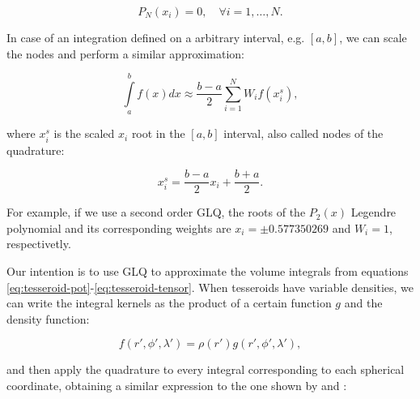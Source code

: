 \documentclass[extra]{gji}
\begin{document}
\begin{equation}
    P_N(x_i) = 0, \quad \forall i = {1,\dots,N}.
\end{equation}

In case of an integration defined on a arbitrary interval, e.g. $[a,b]$, we can scale the nodes and perform a similar approximation:

\begin{equation}
    \int\limits_a^b f(x) dx \approx \frac{b-a}{2} \sum_{i=1}^N W_i f(x_i^s),
\end{equation}

\noindent where $x_i^s$ is the scaled $x_i$ root in the $[a,b]$ interval, also called nodes of the quadrature:

\begin{equation}
    x_i^s = \frac{b-a}{2} x_i + \frac{b+a}{2}.
\end{equation}

For example, if we use a second order GLQ, the roots of the $P_2(x)$ Legendre polynomial and its corresponding weights are $x_i = \pm 0.577350269$ and $W_i = 1$, respectivetly.

Our intention is to use GLQ to approximate the volume integrals from equations \ref{eq:tesseroid-pot}-\ref{eq:tesseroid-tensor}. 
When tesseroids have variable densities, we can write the integral kernels as the product of a certain function $g$ and the density function:

\begin{equation}
    f(r', \phi', \lambda') = \rho(r') g(r', \phi', \lambda'),
\end{equation}

\noindent and then apply the quadrature to every integral corresponding to each spherical coordinate, obtaining a similar expression to the one shown by \citet{Asgharzadeh2007} and \citet{Uieda2016}:

\end{document}
